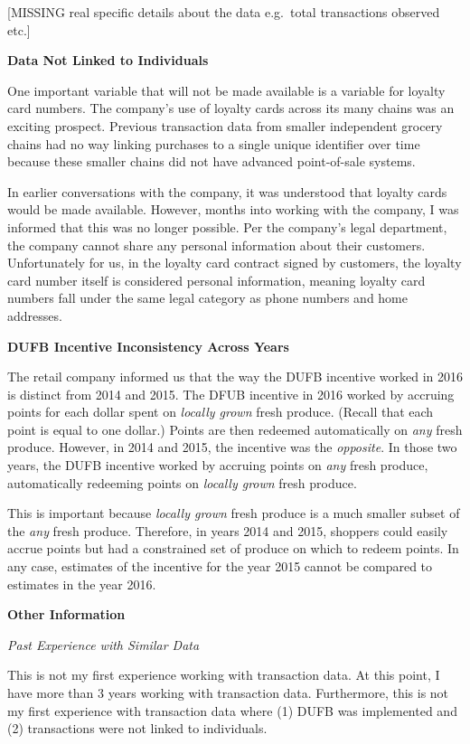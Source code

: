 \documentclass[12pt,letterpaperpaper,]{book}
\begin{document}
{[}MISSING real specific details about the data e.g.~total transactions
observed etc.{]}

\textbf{Data Not Linked to Individuals}

One important variable that will not be made available is a variable for
loyalty card numbers. The company's use of loyalty cards across its many
chains was an exciting prospect. Previous transaction data from smaller
independent grocery chains had no way linking purchases to a single
unique identifier over time because these smaller chains did not have
advanced point-of-sale systems.

In earlier conversations with the company, it was understood that
loyalty cards would be made available. However, months into working with
the company, I was informed that this was no longer possible. Per the
company's legal department, the company cannot share any personal
information about their customers. Unfortunately for us, in the loyalty
card contract signed by customers, the loyalty card number itself is
considered personal information, meaning loyalty card numbers fall under
the same legal category as phone numbers and home addresses.

\textbf{DUFB Incentive Inconsistency Across Years}

The retail company informed us that the way the DUFB incentive worked in
2016 is distinct from 2014 and 2015. The DFUB incentive in 2016 worked
by accruing points for each dollar spent on \emph{locally grown} fresh
produce. (Recall that each point is equal to one dollar.) Points are
then redeemed automatically on \emph{any} fresh produce. However, in
2014 and 2015, the incentive was the \emph{opposite}. In those two
years, the DUFB incentive worked by accruing points on \emph{any} fresh
produce, automatically redeeming points on \emph{locally grown} fresh
produce.

This is important because \emph{locally grown} fresh produce is a much
smaller subset of the \emph{any} fresh produce. Therefore, in years 2014
and 2015, shoppers could easily accrue points but had a constrained set
of produce on which to redeem points. In any case, estimates of the
incentive for the year 2015 cannot be compared to estimates in the year
2016.

\textbf{Other Information}

\emph{Past Experience with Similar Data}

This is not my first experience working with transaction data. At this
point, I have more than 3 years working with transaction data.
Furthermore, this is not my first experience with transaction data where
(1) DUFB was implemented and (2) transactions were not linked to
individuals.
\end{document}

